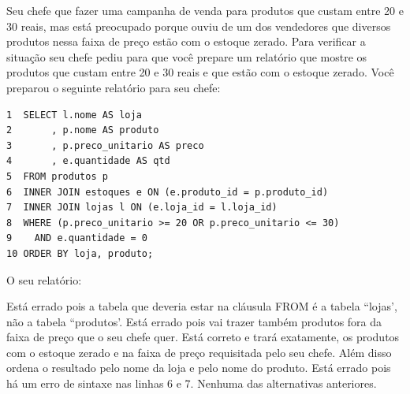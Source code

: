 \documentclass[12pt, addpoints]{exam}
\begin{document}
\begin{questions}
\question
Seu chefe que fazer uma campanha de venda para produtos que custam entre 20 e 30
reais, mas está preocupado porque ouviu de um dos vendedores que diversos
produtos nessa faixa de preço estão com o estoque zerado. Para verificar a
situação seu chefe pediu para que você prepare um relatório que mostre os
produtos que custam entre 20 e 30 reais e que estão com o estoque zerado. Você
preparou o seguinte relatório para seu chefe:
\begin{tcolorbox}
 \begin{verbatim}1  SELECT l.nome AS loja
2       , p.nome AS produto
3       , p.preco_unitario AS preco
4       , e.quantidade AS qtd
5  FROM produtos p
6  INNER JOIN estoques e ON (e.produto_id = p.produto_id)
7  INNER JOIN lojas l ON (e.loja_id = l.loja_id)
8  WHERE (p.preco_unitario >= 20 OR p.preco_unitario <= 30)
9    AND e.quantidade = 0
10 ORDER BY loja, produto;
 \end{verbatim}
\end{tcolorbox}
O seu relatório:
\begin{choices}
\choice Está errado pois a tabela que deveria estar na cláusula FROM é a tabela ``lojas', não a tabela ``produtos'.
\choice Está errado pois vai trazer também produtos fora da faixa de preço que o seu chefe quer.
\choice Está correto e trará exatamente, os produtos com o estoque zerado e na faixa de preço requisitada pelo seu chefe. Além disso ordena o resultado pelo nome da loja e pelo nome do produto.
\choice Está errado pois há um erro de sintaxe nas linhas 6 e 7.
\choice Nenhuma das alternativas anteriores.
\end{choices}



    \end{questions}
    
\end{document}
